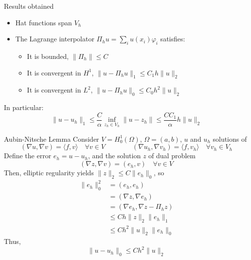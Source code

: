 \documentclass[aspectratio=169]{beamer}
\begin{document}
\begin{frame}{Results obtained}
    \begin{itemize}
        \item Hat functions span $V_h$
        \item The Lagrange interpolator $\Pi_h u = \sum_i u(x_i) \varphi_i$ satisfies:
                \begin{itemize}
                    \item It is bounded, $\| \Pi_h \| \leq C$
                    \item It is convergent in $H^1$, $\| u - \Pi_h u \|_1 \leq C_1 h \| u \|_2$
                    \item It is convergent in $L^2$, $\| u - \Pi_h u \|_0 \leq C_0 h^2 \| u \|_2$
                \end{itemize}
    \end{itemize}
    In particular: 
    $$ \| u - u_h \|_1 \leq \frac{C}{\alpha} \inf_{z_h\in V_h}\|u - z_h\| \leq \frac{C C_1}{\alpha} h \| u \|_2 $$

\end{frame}

\begin{frame}{Aubin-Nitsche Lemma}
    Consider $V=H_0^1(\Omega)$, $\Omega=(a,b)$, $u$ and $u_h$ solutions of
    $$ (\nabla u, \nabla v) = \langle f, v\rangle \quad\forall v\in V \qquad\qquad (\nabla u_h, \nabla v_h) = \langle f, v_h\rangle \quad\forall v_h \in V_h$$
    Define the error $e_h = u-u_h$, and the solution $z$ of dual problem
    $$ (\nabla z, \nabla v) = (e_h, v) \quad \forall v \in V $$
    Then, elliptic regularity yields $\|z\|_2 \leq C \| e_h \|_0$, so
    \begin{align*}
        \| e_h \|_0^2 &= (e_h, e_h) \\
                      &= (\nabla z, \nabla e_h) \tag{Def of dual problem}\\
                      &= (\nabla e_h, \nabla z - \Pi_h z) \tag{Galerkin Orth.} \\
                      &\leq C h\|z\|_2 \|e_h \|_1  \tag{Conv. of $z$}\\
                      &\leq C h^2 \| u \|_2 \|e_h \|_0 \tag{Elliptic reg.}
    \end{align*}
    Thus, 
        $$ \| u - u_h \|_0 \leq C h^2 \| u \|_2 $$
\end{frame}

\begin{frame}
    \titlepage
\end{frame}
\end{document}
